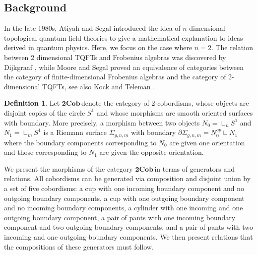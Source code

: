 \documentclass{amsart}
\newcommand{\cob}{$\mathbf{2Cob}$\,}
\theoremstyle{definition}
\newtheorem{Def}[Lem]{Definition}
\begin{document}
\subsection{Background} In the late 1980s, Atiyah \cite{Atiyah} and Segal \cite{Segal} introduced the idea of $n$-dimensional topological quantum field theories to give a mathematical explanation to ideas derived in quantum physics. Here, we focus on the case where $n=2$. The relation between 2 dimensional TQFTs and Frobenius algebras was discovered by Dijkgraaf \cite{Dijkgraaf}, while Moore and Segal \cite{MS} proved an equivalence of categories between the category of finite-dimensional Frobenius algebras and the category of 2-dimensional TQFTs, see also Kock \cite{Kock} and Teleman \cite{Teleman_2011}.
\begin{Def}
	Let \cob denote the category of 2-cobordisms, whose objects are disjoint copies of the circle $S^1$ and whose morphisms are smooth oriented surfaces with boundary. More precisely, a morphism between two objects $N_0=\sqcup_n S^1$ and $N_1=\sqcup_m S^1$ is a Riemann surface $\Sigma_{g,n,m}$ with boundary $\partial\Sigma_{g,n,m}=N_0^{op}\sqcup N_1$ where the boundary components corresponding to $N_0$ are given one orientation and those corresponding to $N_1$ are given the opposite orientation.
\end{Def}  

\noindent We present the morphisms of the category \cob in terms of generators and relations. All cobordisms can be generated via composition and disjoint union by a set of five cobordisms: a cup with one incoming boundary component and no outgoing boundary components, a cup with one outgoing boundary component and no incoming boundary components, a cylinder with one incoming and one outgoing boundary component, a pair of pants with one incoming boundary component and two outgoing boundary components, and a pair of pants with two incoming and one outgoing boundary components. We then present relations that the compositions of these generators must follow.
\end{document}
